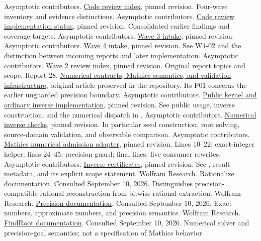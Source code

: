 \documentclass[11pt,letterpaper]{article}
\newcommand{\code}[1]{\texttt{\detokenize{#1}}}
\newcommand{\repo}[2]{\href{https://github.com/VladimirReshetnikov/Asymptotic/blob/8e859961d7d37f008b826f3a8cad406460271614/#1}{#2}}
\begin{document}
\begin{thebibliography}{99}
\small
{} Asymptotic contributors. \repo{external-reports/code-review/README.md}{Code review index}, pinned revision. Four-wave inventory and evidence distinctions.
 Asymptotic contributors. \repo{docs/development/CODE_REVIEW_STATUS.md}{Code review implementation status}, pinned revision. Consolidated earlier findings and coverage targets.
 Asymptotic contributors. \repo{docs/development/WAVE_3_INTAKE.md}{Wave 3 intake}, pinned revision.
 Asymptotic contributors. \repo{docs/development/WAVE_4_INTAKE.md}{Wave 4 intake}, pinned revision. See W4-02 and the distinction between incoming reports and later implementation.
 Asymptotic contributors. \repo{external-reports/code-review/wave-2/README.md}{Wave 2 review index}, pinned revision. Original report topics and scope.
 Report 28. \repo{external-reports/code-review/wave-4/code-review-28/article.tex}{Numerical contracts, Mathics semantics, and validation infrastructure}, original article preserved in the repository. Its F01 concerns the earlier unguarded precision boundary.
 Asymptotic contributors. \repo{src/Kernel/AsymptoticAnalysis.wl}{Public kernel and ordinary inverse implementation}, pinned revision. See public usage, inverse construction, and the numerical dispatch in \code{InverseNumericalCheck}.
 Asymptotic contributors. \repo{src/Kernel/NumericalInverseChecks.wl}{Numerical inverse checks}, pinned revision. In particular seed construction, root solving, source-domain validation, and observable comparison.
 Asymptotic contributors. \repo{src/Kernel/MathicsNumerical.wl}{Mathics numerical admission adapter}, pinned revision. Lines 10--22: exact-integer helper; lines 24--45: precision guard; final lines: five consumer rewrites.
 Asymptotic contributors. \repo{src/Kernel/InverseCertificates.wl}{Inverse certificates}, pinned revision. See \code{certAttempt}, result metadata, and its explicit scope statement.
 Wolfram Research. \href{https://reference.wolfram.com/language/ref/Rationalize.html}{Rationalize documentation}. Consulted September 10, 2026. Distinguishes precision-compatible rational reconstruction from bitwise rational extraction.
 Wolfram Research. \href{https://reference.wolfram.com/language/ref/Precision.html}{Precision documentation}. Consulted September 10, 2026. Exact numbers, approximate numbers, and precision semantics.
 Wolfram Research. \href{https://reference.wolfram.com/language/ref/FindRoot.html}{FindRoot documentation}. Consulted September 10, 2026. Numerical solver and precision-goal semantics; not a specification of Mathics behavior.
\end{thebibliography}
\end{document}
